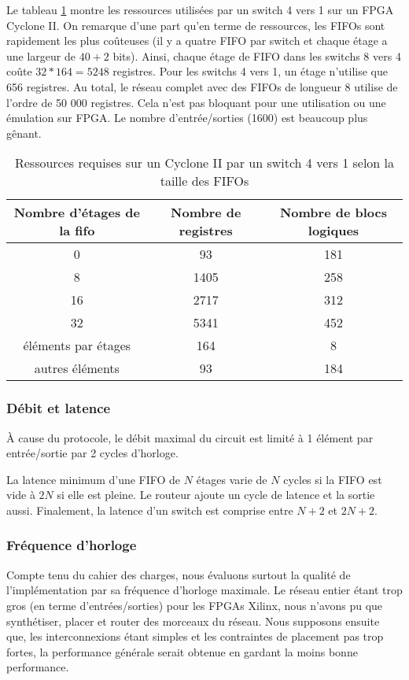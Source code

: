 Le tableau \ref{perfs-sw-4} montre les ressources utilisées par un switch 4 vers
1 sur un FPGA Cyclone II. On remarque d'une part qu'en terme de ressources, les
FIFOs sont rapidement les plus coûteuses (il y a quatre FIFO par switch et
chaque étage a une largeur de $40+2$ bits). Ainsi, chaque étage de FIFO dans les
switchs 8 vers 4 coûte $32*164=5248$ registres. Pour les switchs 4 vers 1, un
étage n'utilise que 656 registres. Au total, le réseau complet avec des FIFOs de
longueur 8 utilise de l'ordre de 50 000 registres.
Cela n'est pas bloquant pour une utilisation ou une émulation sur FPGA. Le
nombre d'entrée/sorties (1600) est beaucoup plus gênant.

\begin{table}
  \centering
  \begin{tabular}{|c|c|c|}
    \hline
    Nombre d'étages de la fifo & Nombre de registres & Nombre de blocs logiques \\
    \hline
    0 & 93 & 181 \\
    8 & 1405 & 258 \\
    16 &  2717 & 312 \\
    32 & 5341 & 452 \\
    \hline \hline
    éléments par étages & 164 & 8 \\
    autres éléments & 93 & 184 \\
    \hline
  \end{tabular}
  \caption{Ressources requises sur un Cyclone II par un switch 4 vers 1 selon la taille des FIFOs}
  \label{perfs-sw-4}
\end{table}

\subsubsection{Débit et latence}

\`A cause du protocole, le débit maximal du circuit est limité à 1 élément par
entrée/sortie par 2 cycles d'horloge.

La latence minimum d'une FIFO de $N$ étages varie de $N$ cycles si la FIFO est
vide à $2N$ si elle est pleine. Le routeur ajoute un cycle de latence et la
sortie aussi. Finalement, la latence d'un switch est comprise entre $N+2$ et
$2N+2$.

\subsubsection{Fréquence d'horloge}

Compte tenu du cahier des charges, nous évaluons surtout la qualité de
l'implémentation par sa fréquence d'horloge maximale. Le réseau entier étant
trop gros (en terme d'entrées/sorties) pour les FPGAs Xilinx, nous n'avons pu
que synthétiser, placer et router des morceaux du réseau. Nous supposons ensuite
que, les interconnexions étant simples et les contraintes de placement pas trop
fortes, la performance générale serait obtenue en gardant la moins bonne
performance.


